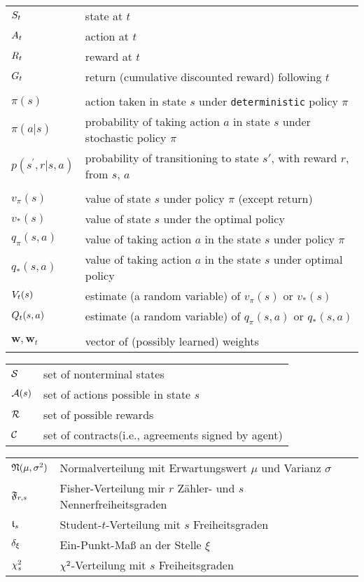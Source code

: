 \begin{tabular}{p{1.5cm} p{12cm}}
$S_t$  & state at $t$ \\
$A_t$  & action at $t$ \\
$R_t$  & reward at $t$ \\
$G_t$  & return (cumulative discounted reward) following $t$ \\
\\
$\pi(s)$  & action taken in state $s$ under \texttt{deterministic} policy $\pi$ \\
$\pi(a|s)$  & probability of taking action $a$ in state $s$ under stochastic policy $\pi$ \\
$p(s^{\prime},r|s,a)$  & probability of transitioning to state $s'$, with reward $r$, from $s$, $a$ \\
\\
$v_\pi(s)$ & value of state $s$ under policy $\pi$ (except return) \\
$v_*(s)$ & value of state $s$ under the optimal policy \\
$q_{\pi}(s, a)$ & value of taking action $a$ in the state $s$ under policy $\pi$ \\
$q_{*}(s, a)$ & value of taking action $a$ in the state $s$ under optimal policy \\
$V_{t}(s)$ & estimate (a random variable) of $v_{\pi}(s)$ or $v_{*}(s)$ \\ 
$Q_{t}(s, a)$ & estimate (a random variable) of $q_{\pi}(s, a)$ or $q_{*}(s, a)$ \\
\\
$\mathbf{w}, \mathbf{w}_{t}$ & vector of (possibly learned) weights \\


\end{tabular}


\begin{tabular}{p{1.5cm} p{12cm}}
$\mathcal{S}$ & set of nonterminal states \\
$\mathcal{A}(s)$ & set of actions possible in state $s$ \\
$\mathcal{R}$ & set of possible rewards \\
$\mathcal{C}$ & set of contracts(i.e., agreements signed by agent) \\
\end{tabular}


\begin{tabular}{p{1.5cm} p{12cm}}
$\mathfrak{N}( \mu, \sigma^2 )$ & Normalverteilung mit Erwartungswert $\mu$ und Varianz $\sigma$ \\
$\mathfrak{F}_{r,s}$ & Fisher-Verteilung mir $r$ Zähler- und $s$ Nennerfreiheitsgraden\\
$\mathfrak{t}_s$ & Student-$t$-Verteilung mit $s$ Freiheitsgraden \\
$\delta_\xi$ & Ein-Punkt-Maß an der Stelle $\xi$ \\
$\chi^2_s$ & $\chi^2$-Verteilung mit $s$ Freiheitsgraden \\
\end{tabular}
